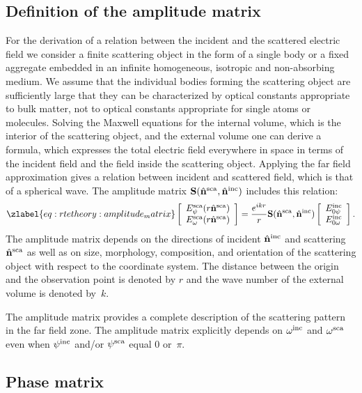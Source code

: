 \subsection{Definition of the amplitude matrix}

For the derivation of a relation between the incident and the
scattered electric field we consider a finite scattering object in the
form of a single body or a fixed aggregate embedded in an infinite
homogeneous, isotropic and non-absorbing medium. We assume that the
individual bodies forming the scattering object are sufficiently large
that they can be characterized by optical constants appropriate to
bulk matter, not to optical constants appropriate for single atoms or
molecules. Solving the Maxwell equations for the internal volume,
which is the interior of the scattering object, and the external
volume one can derive a formula, which expresses the total electric
field everywhere in space in terms of the incident field and the field
inside the scattering object. Applying the far field approximation
gives a relation between incident and scattered field, which is that
of a spherical wave.  The amplitude matrix
$\mathbf{S}(\hat{{\bf n}}^{\mathrm{sca}},\hat{{\bf n}}^{\mathrm{inc}})$ includes this relation:
\begin{equation}
  \zlabel{eq:rtetheory:amplitude_matrix}
  \ColVctTwo{E_\ZntAng^{\sca}(r\hat{\PDir}^{\sca})}%
         {E_\AzmAng^{\sca}(r\hat{\PDir}^{\sca})}
         = \frac{e^{ikr}}{r}\MtrStl{S}(\hat{\PDir}^{\sca},\hat{\PDir}^{\inc}) 
 \ColVctTwo{E_{0\ZntAng}^{\inc}}%
         {E_{0\AzmAng}^{\inc}}.
\end{equation}
The amplitude matrix depends on the directions of incident
$\hat{{\bf n}}^{\mathrm{inc}}$ and scattering $\hat{{\bf n}}^{\mathrm{sca}}$ as well as on size,
morphology, composition, and orientation of the scattering object with
respect to the coordinate system. The distance between the origin and
the observation point is denoted by $r$ and the wave number of the
external volume is denoted by~$k$.

The amplitude matrix provides a complete description of the scattering
pattern in the far field zone. The amplitude matrix explicitly depends
on $\omega^{\mathrm{inc}}$ and $\omega^{\mathrm{sca}}$ even when $\psi^{\mathrm{inc}}$ and/or
$\psi^{\mathrm{sca}}$ equal 0 or~$\pi$.

\subsection{Phase matrix}

